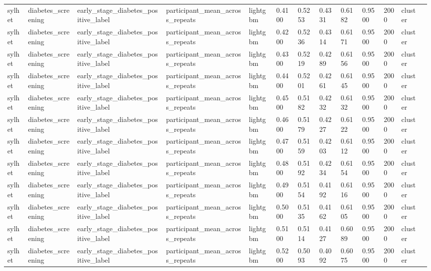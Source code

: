 \begin{tabular}{lllllllllllll}
sylhet & diabetes\_screening & early\_stage\_diabetes\_positive\_label & participant\_mean\_across\_repeats & lightgbm & 0.4100 & 0.5253 & 0.4331 & 0.6182 & 0.9500 & 2000 & cluster &  \\
sylhet & diabetes\_screening & early\_stage\_diabetes\_positive\_label & participant\_mean\_across\_repeats & lightgbm & 0.4200 & 0.5236 & 0.4314 & 0.6171 & 0.9500 & 2000 & cluster &  \\
sylhet & diabetes\_screening & early\_stage\_diabetes\_positive\_label & participant\_mean\_across\_repeats & lightgbm & 0.4300 & 0.5219 & 0.4289 & 0.6156 & 0.9500 & 2000 & cluster &  \\
sylhet & diabetes\_screening & early\_stage\_diabetes\_positive\_label & participant\_mean\_across\_repeats & lightgbm & 0.4400 & 0.5201 & 0.4261 & 0.6145 & 0.9500 & 2000 & cluster &  \\
sylhet & diabetes\_screening & early\_stage\_diabetes\_positive\_label & participant\_mean\_across\_repeats & lightgbm & 0.4500 & 0.5182 & 0.4232 & 0.6132 & 0.9500 & 2000 & cluster &  \\
sylhet & diabetes\_screening & early\_stage\_diabetes\_positive\_label & participant\_mean\_across\_repeats & lightgbm & 0.4600 & 0.5179 & 0.4227 & 0.6122 & 0.9500 & 2000 & cluster &  \\
sylhet & diabetes\_screening & early\_stage\_diabetes\_positive\_label & participant\_mean\_across\_repeats & lightgbm & 0.4700 & 0.5159 & 0.4203 & 0.6112 & 0.9500 & 2000 & cluster &  \\
sylhet & diabetes\_screening & early\_stage\_diabetes\_positive\_label & participant\_mean\_across\_repeats & lightgbm & 0.4800 & 0.5192 & 0.4234 & 0.6154 & 0.9500 & 2000 & cluster &  \\
sylhet & diabetes\_screening & early\_stage\_diabetes\_positive\_label & participant\_mean\_across\_repeats & lightgbm & 0.4900 & 0.5154 & 0.4192 & 0.6116 & 0.9500 & 2000 & cluster &  \\
sylhet & diabetes\_screening & early\_stage\_diabetes\_positive\_label & participant\_mean\_across\_repeats & lightgbm & 0.5000 & 0.5135 & 0.4162 & 0.6105 & 0.9500 & 2000 & cluster &  \\
sylhet & diabetes\_screening & early\_stage\_diabetes\_positive\_label & participant\_mean\_across\_repeats & lightgbm & 0.5100 & 0.5114 & 0.4127 & 0.6089 & 0.9500 & 2000 & cluster &  \\
sylhet & diabetes\_screening & early\_stage\_diabetes\_positive\_label & participant\_mean\_across\_repeats & lightgbm & 0.5200 & 0.5093 & 0.4092 & 0.6075 & 0.9500 & 2000 & cluster &  \\

\end{tabular}
